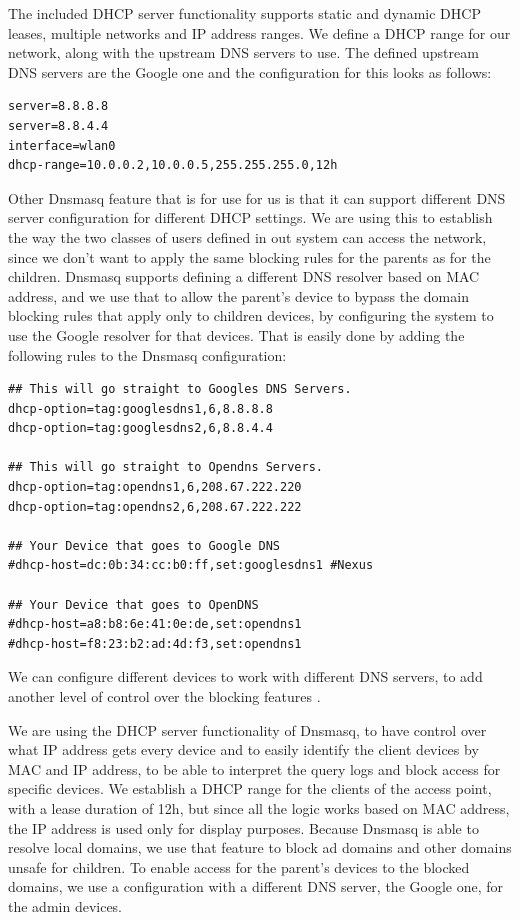 The included DHCP server functionality supports static and dynamic DHCP leases, multiple networks and IP address ranges. We define a DHCP range for our network, along with the upstream DNS servers to use. The defined upstream DNS servers are the Google one and the configuration for this looks as follows:

\begin{lstlisting}
server=8.8.8.8
server=8.8.4.4
interface=wlan0
dhcp-range=10.0.0.2,10.0.0.5,255.255.255.0,12h
\end{lstlisting}

Other Dnsmasq feature that is for use for us is that it can support different DNS server configuration for different DHCP settings. We are using this to establish the way the two classes of users defined in out system can access the network, since we don't want to apply the same blocking rules for the parents as for the children. Dnsmasq supports defining a different DNS resolver based on MAC address, and we use that to allow the parent's device to bypass the domain blocking rules that apply only to children devices, by configuring the system to use the Google resolver for that devices. That is easily done by adding the following rules to the Dnsmasq configuration:

\begin{lstlisting}
## This will go straight to Googles DNS Servers.
dhcp-option=tag:googlesdns1,6,8.8.8.8
dhcp-option=tag:googlesdns2,6,8.8.4.4

## This will go straight to Opendns Servers.
dhcp-option=tag:opendns1,6,208.67.222.220
dhcp-option=tag:opendns2,6,208.67.222.222

## Your Device that goes to Google DNS
#dhcp-host=dc:0b:34:cc:b0:ff,set:googlesdns1 #Nexus

## Your Device that goes to OpenDNS
#dhcp-host=a8:b8:6e:41:0e:de,set:opendns1
#dhcp-host=f8:23:b2:ad:4d:f3,set:opendns1
\end{lstlisting}

We can configure different devices to work with different DNS servers, to add another level of control over the blocking features \cite{archwikiDnsmasq}.

We are using the DHCP server functionality of Dnsmasq, to have control over what IP address gets every device and to easily identify the client devices by MAC and IP address, to be able to interpret the query logs and block access for specific devices. We establish a DHCP range for the clients of the access point, with a lease duration of 12h, but since all the logic works based on MAC address, the IP address is used only for display purposes. Because Dnsmasq is able to resolve local domains, we use that feature to block ad domains and other domains unsafe for children. To enable access for the parent's devices to the blocked domains, we use a configuration with a different DNS server, the Google one, for the admin devices.

